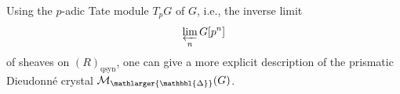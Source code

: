 \documentclass{amsart}
\newcommand{\prism}{{\mathlarger{\mathbbl{\Delta}}}}
\theoremstyle{plain}
\theoremstyle{definition}
\begin{document}

Using the $p$-adic Tate module $T_pG$ of $G$, i.e., the inverse limit
$$
\varprojlim\limits_{n} G[p^n]
$$
of sheaves on $(R)_{\mathrm{qsyn}}$, one can give a more explicit description of the prismatic Dieudonn\'e crystal $\mathcal{M}_{\prism}(G)$.
\end{document}
